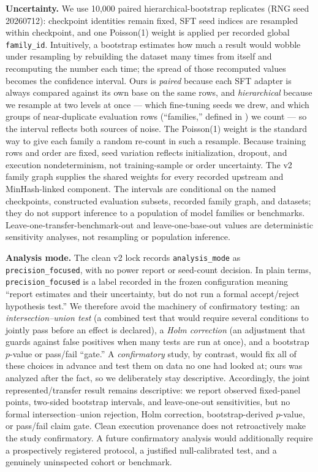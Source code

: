 \documentclass[11pt]{article}
\begin{document}
\textbf{Uncertainty.} We use 10{,}000 paired hierarchical-bootstrap replicates (RNG seed 20260712): checkpoint identities remain fixed, SFT seed indices are resampled within checkpoint, and one Poisson(1) weight is applied per recorded global \texttt{family\_id}. Intuitively, a bootstrap estimates how much a result would wobble under resampling by rebuilding the dataset many times from itself and recomputing the number each time; the spread of those recomputed values becomes the confidence interval. Ours is \emph{paired} because each SFT adapter is always compared against its own base on the same rows, and \emph{hierarchical} because we resample at two levels at once --- which fine-tuning seeds we drew, and which groups of near-duplicate evaluation rows (``families,'' defined in ) we count --- so the interval reflects both sources of noise. The Poisson(1) weight is the standard way to give each family a random re-count in such a resample. Because training rows and order are fixed, seed variation reflects initialization, dropout, and execution nondeterminism, not training-sample or order uncertainty. The v2 family graph supplies the shared weights for every recorded upstream and MinHash-linked component. The intervals are conditional on the named checkpoints, constructed evaluation subsets, recorded family graph, and datasets; they do not support inference to a population of model families or benchmarks. Leave-one-transfer-benchmark-out and leave-one-base-out values are deterministic sensitivity analyses, not resampling or population inference.

\textbf{Analysis mode.} The clean v2 lock records \texttt{analysis\_mode} as \texttt{precision\_focused}, with no power report or seed-count decision. In plain terms, \texttt{precision\_focused} is a label recorded in the frozen configuration meaning ``report estimates and their uncertainty, but do not run a formal accept/reject hypothesis test.'' We therefore avoid the machinery of confirmatory testing: an \emph{intersection--union test} (a combined test that would require several conditions to jointly pass before an effect is declared), a \emph{Holm correction} (an adjustment that guards against false positives when many tests are run at once), and a bootstrap $p$-value or pass/fail ``gate.'' A \emph{confirmatory} study, by contrast, would fix all of these choices in advance and test them on data no one had looked at; ours was analyzed after the fact, so we deliberately stay descriptive. Accordingly, the joint represented/transfer result remains descriptive: we report observed fixed-panel points, two-sided bootstrap intervals, and leave-one-out sensitivities, but no formal intersection--union rejection, Holm correction, bootstrap-derived $p$-value, or pass/fail claim gate. Clean execution provenance does not retroactively make the study confirmatory. A future confirmatory analysis would additionally require a prospectively registered protocol, a justified null-calibrated test, and a genuinely uninspected cohort or benchmark.
\end{document}
